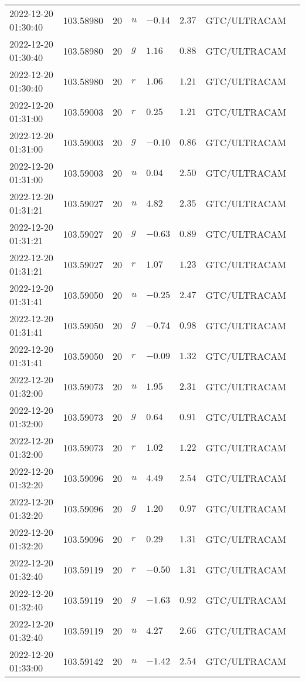 \documentclass{nature_plusfigure}
\begin{document}
\begin{supplement}
\begin{center}
\begin{longtable}{llllllll}
2022-12-20 01:30:40 & 103.58980 & 20 & $u$ & $-0.14$ & $2.37$ & GTC/ULTRACAM &  \\ 
2022-12-20 01:30:40 & 103.58980 & 20 & $g$ & $1.16$ & $0.88$ & GTC/ULTRACAM &  \\ 
2022-12-20 01:30:40 & 103.58980 & 20 & $r$ & $1.06$ & $1.21$ & GTC/ULTRACAM &  \\ 
2022-12-20 01:31:00 & 103.59003 & 20 & $r$ & $0.25$ & $1.21$ & GTC/ULTRACAM &  \\ 
2022-12-20 01:31:00 & 103.59003 & 20 & $g$ & $-0.10$ & $0.86$ & GTC/ULTRACAM &  \\ 
2022-12-20 01:31:00 & 103.59003 & 20 & $u$ & $0.04$ & $2.50$ & GTC/ULTRACAM &  \\ 
2022-12-20 01:31:21 & 103.59027 & 20 & $u$ & $4.82$ & $2.35$ & GTC/ULTRACAM &  \\ 
2022-12-20 01:31:21 & 103.59027 & 20 & $g$ & $-0.63$ & $0.89$ & GTC/ULTRACAM &  \\ 
2022-12-20 01:31:21 & 103.59027 & 20 & $r$ & $1.07$ & $1.23$ & GTC/ULTRACAM &  \\ 
2022-12-20 01:31:41 & 103.59050 & 20 & $u$ & $-0.25$ & $2.47$ & GTC/ULTRACAM &  \\ 
2022-12-20 01:31:41 & 103.59050 & 20 & $g$ & $-0.74$ & $0.98$ & GTC/ULTRACAM &  \\ 
2022-12-20 01:31:41 & 103.59050 & 20 & $r$ & $-0.09$ & $1.32$ & GTC/ULTRACAM &  \\ 
2022-12-20 01:32:00 & 103.59073 & 20 & $u$ & $1.95$ & $2.31$ & GTC/ULTRACAM &  \\ 
2022-12-20 01:32:00 & 103.59073 & 20 & $g$ & $0.64$ & $0.91$ & GTC/ULTRACAM &  \\ 
2022-12-20 01:32:00 & 103.59073 & 20 & $r$ & $1.02$ & $1.22$ & GTC/ULTRACAM &  \\ 
2022-12-20 01:32:20 & 103.59096 & 20 & $u$ & $4.49$ & $2.54$ & GTC/ULTRACAM &  \\ 
2022-12-20 01:32:20 & 103.59096 & 20 & $g$ & $1.20$ & $0.97$ & GTC/ULTRACAM &  \\ 
2022-12-20 01:32:20 & 103.59096 & 20 & $r$ & $0.29$ & $1.31$ & GTC/ULTRACAM &  \\ 
2022-12-20 01:32:40 & 103.59119 & 20 & $r$ & $-0.50$ & $1.31$ & GTC/ULTRACAM &  \\ 
2022-12-20 01:32:40 & 103.59119 & 20 & $g$ & $-1.63$ & $0.92$ & GTC/ULTRACAM &  \\ 
2022-12-20 01:32:40 & 103.59119 & 20 & $u$ & $4.27$ & $2.66$ & GTC/ULTRACAM &  \\ 
2022-12-20 01:33:00 & 103.59142 & 20 & $u$ & $-1.42$ & $2.54$ & GTC/ULTRACAM &  \\ 

\end{longtable}
\end{center}
\end{supplement}
\end{document}

